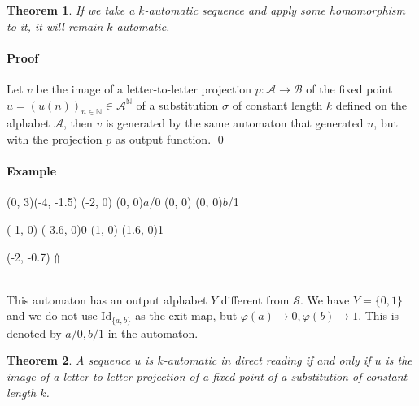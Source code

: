 \documentclass{article}
\begin{document}
\newtheorem{automata}{Theorem} \begin{automata} 
If we take a $k$-automatic sequence and apply some homomorphism to it, it will 
remain $k$-automatic.
\end{automata}

\paragraph{Proof} Let $v$ be the image of a letter-to-letter
projection $p: \mathcal{A} \to \mathcal{B}$ of the fixed point
$u = (u(n))_{n \in \mathbb{N}} \in \mathcal{A}^\mathbb{N}$ of a substitution
$\sigma$ of constant length $k$ defined on the alphabet $\mathcal{A}$, then
$v$ is generated by the same automaton that generated $u$, but with the
projection $p$ as output function. \qed

\paragraph{Example\\}
\begin{graph}(0, 3)(-4, -1.5)
  (-2, 0) (0, 0){$a$/0}
  (0, 0)  (0, 0){$b$/1}

  (-1, 0) \freetext(-3.6, 0){0}
   
   
  (1, 0) \freetext(1.6, 0){1}

  \freetext(-2, -0.7){$\Uparrow$}
\end{graph}\\
This automaton has an output alphabet $Y$ different from $\mathcal{S}$. We 
have $Y = \{0, 1\}$ and we do not use Id$_{\{a, b\}}$ as the exit map, but
$\varphi(a) \to 0, \varphi(b) \to 1$. This is denoted by
$a/0, b/1$ in the automaton.

\begin{automata} \label{directreading}
A sequence $u$ is $k$-automatic in direct reading if and only if $u$ is the 
image of a letter-to-letter projection of a fixed point of a substitution of 
constant length $k$.
\end{automata}
\end{document}
